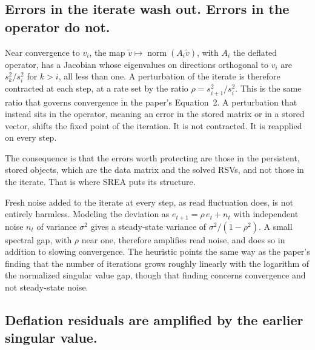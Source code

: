 \documentclass[11pt]{article}
\theoremstyle{definition}
\theoremstyle{remark}
\begin{document}
\subsection{Errors in the iterate wash out. Errors in the operator do not.}

Near convergence to $v_i$, the map $\tilde v\mapsto\operatorname{norm}(A_i\tilde v)$, with $A_i$ the deflated operator, has a Jacobian whose eigenvalues on directions orthogonal to $v_i$ are $s_k^2/s_i^2$ for $k>i$, all less than one. A perturbation of the iterate is therefore contracted at each step, at a rate set by the ratio $\rho=s_{i+1}^2/s_i^2$. This is the same ratio that governs convergence in the paper's Equation~2. A perturbation that instead sits in the operator, meaning an error in the stored matrix or in a stored vector, shifts the fixed point of the iteration. It is not contracted. It is reapplied on every step.

The consequence is that the errors worth protecting are those in the persistent, stored objects, which are the data matrix and the solved RSVs, and not those in the iterate. That is where SREA puts its structure.

Fresh noise added to the iterate at every step, as read fluctuation does, is not entirely harmless. Modeling the deviation as $e_{t+1}=\rho\,e_t+n_t$ with independent noise $n_t$ of variance $\sigma^2$ gives a steady-state variance of $\sigma^2/(1-\rho^2)$. A small spectral gap, with $\rho$ near one, therefore amplifies read noise, and does so in addition to slowing convergence. The heuristic points the same way as the paper's finding that the number of iterations grows roughly linearly with the logarithm of the normalized singular value gap, though that finding concerns convergence and not steady-state noise.

\subsection{Deflation residuals are amplified by the earlier singular value.}
\end{document}
